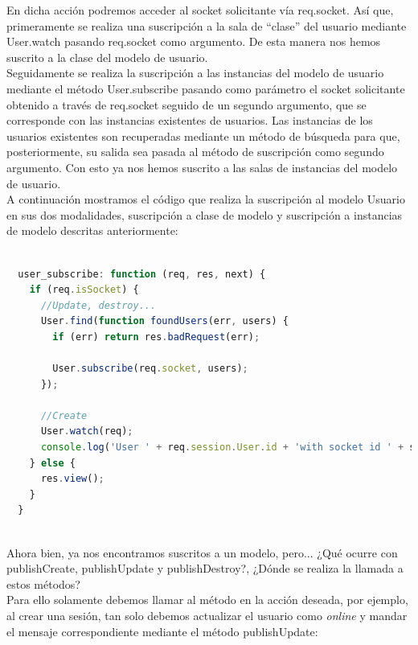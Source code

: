 En dicha acción podremos acceder al socket solicitante vía req.socket. Así que, primeramente se realiza una suscripción a la sala de ``clase'' del usuario mediante User.watch pasando 
req.socket como argumento. De esta manera nos hemos suscrito a la clase del modelo de usuario.\\

Seguidamente se realiza la suscripción a las instancias del modelo de usuario mediante el método User.subscribe pasando como parámetro el socket solicitante obtenido a través de req.socket seguido
de un segundo argumento, que se corresponde con las instancias existentes de usuarios. Las instancias de los usuarios existentes son recuperadas mediante un método de búsqueda para que, posteriormente, su salida 
sea pasada al método de suscripción como segundo argumento. Con esto ya nos hemos suscrito a las salas de instancias del modelo de usuario.\\

A continuación mostramos el código que realiza la suscripción al modelo Usuario en sus dos modalidades, suscripción a clase de modelo y suscripción a instancias de modelo descritas anteriormente:\\

\begin{lstlisting}[language=JavaScript]

  user_subscribe: function (req, res, next) {
    if (req.isSocket) {
      //Update, destroy...
      User.find(function foundUsers(err, users) {
        if (err) return res.badRequest(err);

        User.subscribe(req.socket, users);
      });

      //Create
      User.watch(req);
      console.log('User ' + req.session.User.id + 'with socket id ' + sails.sockets.id(req) + ' is now subscribed to the model class \'User\'.');
    } else {
      res.view();
    }
  }
  
\end{lstlisting}

Ahora bien, ya nos encontramos suscritos a un modelo, pero... ¿Qué ocurre con publishCreate, publishUpdate y publishDestroy?, ¿Dónde se realiza la llamada a estos métodos?\\


Para ello solamente debemos llamar al método en la acción deseada, por ejemplo, al crear una sesión, tan solo debemos actualizar el usuario como \emph{online} y mandar el mensaje correspondiente mediante
el método publishUpdate:\\

